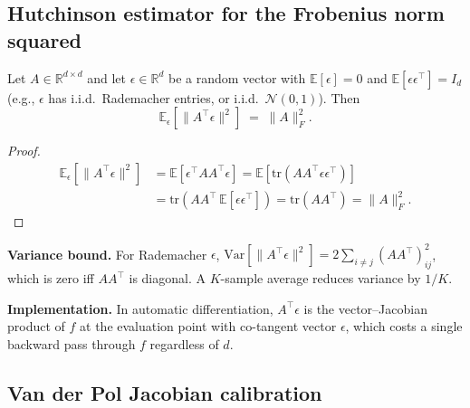 \subsection{Hutchinson estimator for the Frobenius norm squared}
\label{app:hutchinson}

\begin{theorem}
\label{thm:hutchinson}
Let $A \in \mathbb{R}^{d \times d}$ and let $\epsilon \in \mathbb{R}^d$ be a random
vector with $\mathbb{E}[\epsilon] = 0$ and $\mathbb{E}[\epsilon \epsilon^\top] = I_d$
(e.g., $\epsilon$ has i.i.d.\ Rademacher entries, or i.i.d.\ $\mathcal{N}(0,1)$).
Then
\begin{equation}
\mathbb{E}_\epsilon\!\left[\|A^\top \epsilon\|^2\right] \;=\; \|A\|_F^2.
\label{eq:hutchinson}
\end{equation}
\end{theorem}

\begin{proof}
\begin{align}
\mathbb{E}_\epsilon\!\left[\|A^\top \epsilon\|^2\right]
&= \mathbb{E}\left[\epsilon^\top A A^\top \epsilon\right]
 = \mathbb{E}\!\left[\mathrm{tr}\!\left(A A^\top \epsilon \epsilon^\top\right)\right] \\
&= \mathrm{tr}\!\left(A A^\top \, \mathbb{E}[\epsilon \epsilon^\top]\right)
 = \mathrm{tr}(A A^\top)
 = \|A\|_F^2.
\end{align}
\end{proof}

\textbf{Variance bound.} For Rademacher $\epsilon$,
$\mathrm{Var}[\|A^\top \epsilon\|^2] = 2 \sum_{i \neq j} (AA^\top)_{ij}^2$, which is
zero iff $AA^\top$ is diagonal. A $K$-sample average reduces variance by $1/K$.

\textbf{Implementation.} In automatic differentiation, $A^\top \epsilon$ is the
vector--Jacobian product of $f$ at the evaluation point with co-tangent vector
$\epsilon$, which costs a single backward pass through $f$ regardless of $d$.

\subsection{Van der Pol Jacobian calibration}
\label{app:vdp-jac-calibration}

